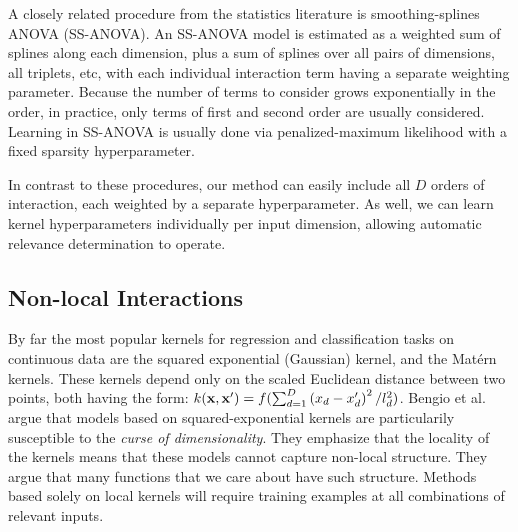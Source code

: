 A closely related procedure from the statistics literature is smoothing-splines ANOVA (SS-ANOVA)\cite{wahba1990spline}. An SS-ANOVA model is estimated as a weighted sum of splines along each dimension, plus a sum of splines over all pairs of dimensions, all triplets, etc, with each individual interaction term having a separate weighting parameter.  Because the number of terms to consider grows exponentially in the order, in practice, only terms of first and second order are usually considered.  Learning in SS-ANOVA is usually done via penalized-maximum likelihood with a fixed sparsity hyperparameter.


In contrast to these procedures, our method can easily include all $D$ orders of interaction, each weighted by a separate hyperparameter. As well, we can learn kernel hyperparameters individually per input dimension, allowing automatic relevance determination to operate.

\subsection{Non-local Interactions}

%
By far the most popular kernels for regression and classification tasks on continuous data are the squared exponential (Gaussian) kernel, and the Mat\'{e}rn kernels.  These kernels depend only on the scaled Euclidean distance between two points, both having the form: $ k({\bf x, x'}) = f(\sum_{d=1}^D \left( x_{d} - x_{d}' \right)^2 / l_d^2)$.
Bengio et al.\cite{bengio2006curse} argue that models based on squared-exponential kernels are particularily susceptible to the \textit{curse of dimensionality}.  They emphasize that the locality of the kernels means that these models cannot capture non-local structure.  They argue that many functions that we care about have such structure.  Methods based solely on local kernels will require training examples at all combinations of relevant inputs.

